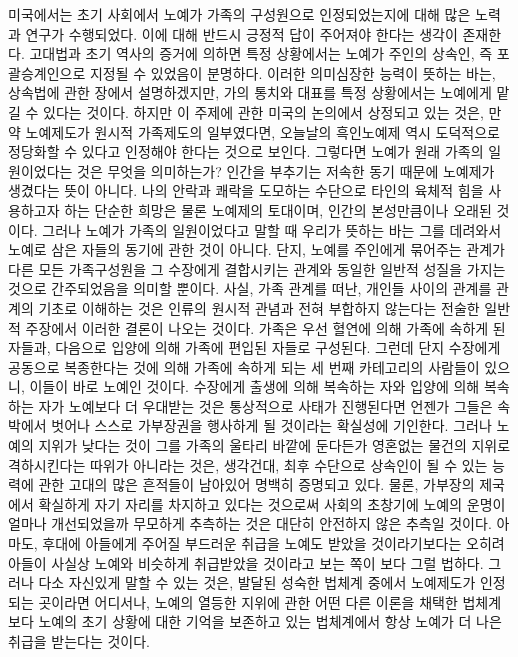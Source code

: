 미국에서는
초기 사회에서 노예가 가족의 구성원으로 인정되었는지에 대해
많은 노력과 연구가
수행되었다.
이에 대해 반드시 긍정적 답이 주어져야 한다는 생각이 존재한다.
고대법과 초기 역사의 증거에 의하면
특정 상황에서는 노예가 주인의 상속인, 즉 포괄승계인으로 지정될 수 있었음이
분명하다.
이러한 의미심장한 능력이 뜻하는 바는,
상속법에 관한 장에서 설명하겠지만,
가의 통치와 대표를 특정 상황에서는 노예에게 맡길 수 있다는 것이다.
하지만 이 주제에 관한 미국의 논의에서 상정되고 있는 것은,
만약 노예제도가 원시적 가족제도의 일부였다면,
오늘날의 흑인노예제 역시 도덕적으로 정당화할 수 있다고 인정해야
한다는 것으로 보인다.
그렇다면 노예가 원래 가족의 일원이었다는 것은 무엇을 의미하는가?
인간을 부추기는 저속한 동기 때문에 노예제가 생겼다는 뜻이 아니다.
나의 안락과 쾌락을 도모하는 수단으로 타인의 육체적 힘을 사용하고자 하는
단순한 희망은 물론 노예제의 토대이며,
인간의 본성만큼이나 오래된 것이다.
그러나 노예가 가족의 일원이었다고 말할 때 우리가 뜻하는 바는
그를 데려와서 노예로 삼은 자들의 동기에 관한 것이 아니다.
단지,
노예를 주인에게 묶어주는 관계가
다른 모든 가족구성원을 그 수장에게 결합시키는
관계와 동일한 일반적 성질을 가지는 것으로 간주되었음을 의미할 뿐이다.
사실,
가족 관계를 떠난, 개인들 사이의 관계를
관계의 기초로 이해하는 것은
인류의 원시적 관념과
전혀 부합하지 않는다는
전술한 일반적 주장에서 이러한 결론이 나오는 것이다.
가족은 우선 혈연에 의해 가족에 속하게 된 자들과,
다음으로 입양에 의해 가족에 편입된 자들로 구성된다.
그런데
단지 수장에게 공동으로 복종한다는 것에 의해 가족에 속하게 되는
세 번째 카테고리의 사람들이 있으니,
이들이 바로 노예인 것이다.
수장에게 출생에 의해 복속하는 자와 입양에 의해 복속하는 자가
노예보다 더 우대받는 것은 통상적으로 사태가 진행된다면
언젠가 그들은 속박에서 벗어나 스스로 가부장권을 행사하게 될 것이라는
확실성에 기인한다.
그러나 노예의 지위가 낮다는 것이
그를 가족의 울타리 바깥에 둔다든가
영혼없는 물건의 지위로 격하시킨다는 따위가 아니라는 것은,
생각건대,
최후 수단으로 상속인이 될 수 있는 능력에 관한
고대의 많은 흔적들이 남아있어
명백히 증명되고 있다.
물론,
가부장의 제국에서 확실하게 자기 자리를 차지하고 있다는 것으로써
사회의 초창기에 노예의 운명이 얼마나 개선되었을까 무모하게 추측하는 것은
대단히 안전하지 않은 추측일 것이다.
아마도,
후대에 아들에게 주어질 부드러운 취급을 노예도 받았을 것이라기보다는
오히려 아들이 사실상 노예와 비슷하게 취급받았을 것이라고 보는 쪽이
보다 그럴 법하다.
그러나
다소 자신있게 말할 수 있는 것은,
발달된 성숙한 법체계 중에서
노예제도가 인정되는 곳이라면 어디서나,
노예의 열등한 지위에 관한 어떤 다른 이론을 채택한 법체계보다
노예의 초기 상황에 대한 기억을 보존하고 있는 법체계에서
항상 노예가 더 나은 취급을 받는다는 것이다.
